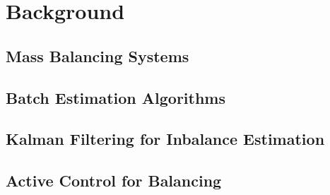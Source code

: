 \chapter{Background} \label{chap:background}
\section{Mass Balancing Systems}

\section{Batch Estimation Algorithms}

\section{Kalman Filtering for Inbalance Estimation}

\section{Active Control for Balancing}